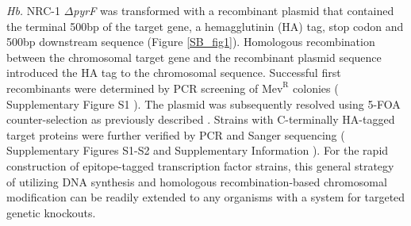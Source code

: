 {\em Hb.} NRC-1 $\Delta${\em pyrF} was transformed with a recombinant plasmid that contained the terminal 500bp of the target gene, a hemagglutinin (HA) tag, stop codon and 500bp downstream sequence (Figure \ref{SB_fig1}). Homologous recombination between the chromosomal target gene and the recombinant plasmid sequence introduced the HA tag to the chromosomal sequence. Successful first recombinants were determined by PCR screening of $\mathrm{Mev}^{\mathrm{R}}$ colonies ( Supplementary Figure S1 ). The plasmid was subsequently resolved using 5-FOA counter-selection as previously described \cite{kaur_systems_2006,peck_homologous_2000}. Strains with C-terminally HA-tagged target proteins were further verified by PCR and Sanger sequencing ( Supplementary Figures S1-S2 and Supplementary Information ). For the rapid construction of epitope-tagged transcription factor strains, this general strategy of utilizing DNA synthesis and homologous recombination-based chromosomal modification can be readily extended to any organisms with a system for targeted genetic knockouts.

